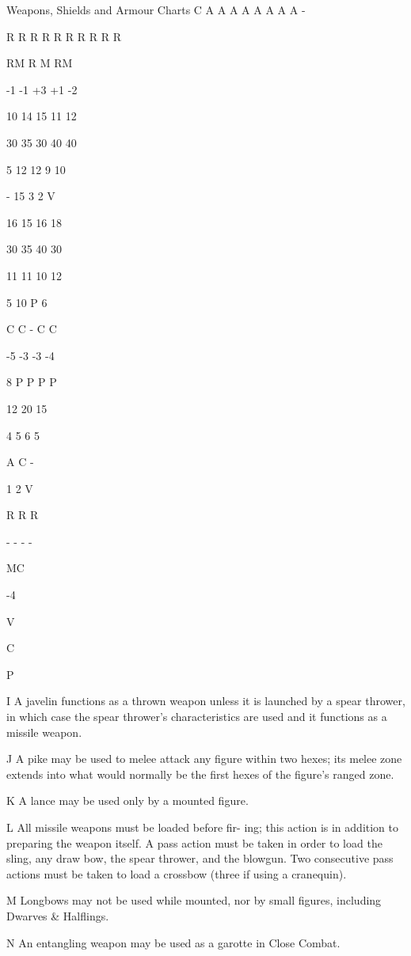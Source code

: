 \begin{Table}{Weapons, Shields and Armour Charts}
C 
A 
A 
A 
A 
A 
A 
A 
A 
- 

R 
R 
R 
R 
R 
R 
R 
R 
R 
R 

RM 
R 
M 
RM 

-1 
-1 
+3 
+1 
-2 

10 
14 
15 
11 
12 

30 
35 
30 
40 
40 

5 
12 
12 
9 
10 

- 
15 
3 
2 
V 

16 
15 
16 
18 

30 
35 
40 
30 

11 
11 
10 
12 

5 
10 
P 
6 

C 
C 
- 
C 
C 

-5 
-3 
-3 
-4 

8 
P 
P 
P 
P 

12 
20 
15 

4 
5 
6 
5 

A 
C 
- 

1 
2 
V 

R 
R 
R 

- 
- 
- 
- 

MC 

-4 

V 

C 

P 

 

 


I A javelin functions as a thrown weapon unless it 
is  launched  by  a  spear  thrower,  in  which  case  the 
spear  thrower’s  characteristics  are  used  and  it 
functions as a missile weapon. 

J  A  pike  may  be  used  to  melee  attack  any  figure 
within two hexes; its melee zone extends into what 
would  normally  be  the  first  hexes  of  the  figure’s 
ranged zone. 

K A lance may be used only by a mounted figure. 

L  All  missile  weapons  must  be  loaded  before  fir-
ing;  this  action  is  in  addition  to  preparing  the 
weapon itself. A pass action must be taken in order 
to load the sling, any draw bow, the spear thrower, 
and  the  blowgun.  Two  consecutive  pass  actions 
must be taken to load a crossbow (three if using a 
cranequin). 

M Longbows may not be used while mounted, nor 
by small figures, including Dwarves \& Halflings. 

N An entangling weapon may be used as a garotte 
in Close Combat. 


\end{Table}
